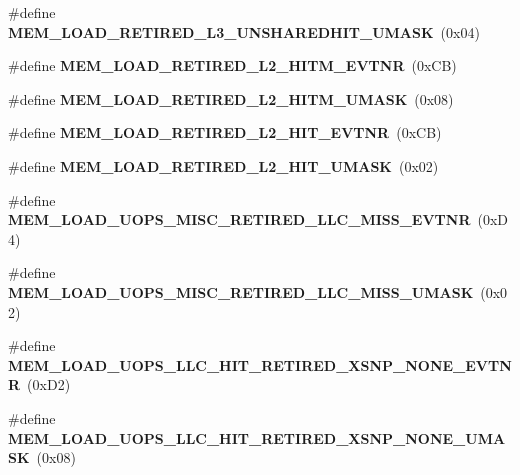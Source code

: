 \begin{DoxyCompactItemize}
\item 
\#define {\bfseries M\+E\+M\+\_\+\+L\+O\+A\+D\+\_\+\+R\+E\+T\+I\+R\+E\+D\+\_\+\+L3\+\_\+\+U\+N\+S\+H\+A\+R\+E\+D\+H\+I\+T\+\_\+\+U\+M\+A\+SK}~(0x04)\label{types_8h_a82af69ba17f2c14d73f672e6ab64392d}

\item 
\#define {\bfseries M\+E\+M\+\_\+\+L\+O\+A\+D\+\_\+\+R\+E\+T\+I\+R\+E\+D\+\_\+\+L2\+\_\+\+H\+I\+T\+M\+\_\+\+E\+V\+T\+NR}~(0x\+C\+B)\label{types_8h_a4fa3ebccc930b769a6fab108e11d98a1}

\item 
\#define {\bfseries M\+E\+M\+\_\+\+L\+O\+A\+D\+\_\+\+R\+E\+T\+I\+R\+E\+D\+\_\+\+L2\+\_\+\+H\+I\+T\+M\+\_\+\+U\+M\+A\+SK}~(0x08)\label{types_8h_a425b82db02859d2176d1626972950617}

\item 
\#define {\bfseries M\+E\+M\+\_\+\+L\+O\+A\+D\+\_\+\+R\+E\+T\+I\+R\+E\+D\+\_\+\+L2\+\_\+\+H\+I\+T\+\_\+\+E\+V\+T\+NR}~(0x\+C\+B)\label{types_8h_ab0383f3dadd106b0e563ad7459a4fc78}

\item 
\#define {\bfseries M\+E\+M\+\_\+\+L\+O\+A\+D\+\_\+\+R\+E\+T\+I\+R\+E\+D\+\_\+\+L2\+\_\+\+H\+I\+T\+\_\+\+U\+M\+A\+SK}~(0x02)\label{types_8h_a74427facc02a83299c443b9b6e424cc1}

\item 
\#define {\bfseries M\+E\+M\+\_\+\+L\+O\+A\+D\+\_\+\+U\+O\+P\+S\+\_\+\+M\+I\+S\+C\+\_\+\+R\+E\+T\+I\+R\+E\+D\+\_\+\+L\+L\+C\+\_\+\+M\+I\+S\+S\+\_\+\+E\+V\+T\+NR}~(0x\+D4)\label{types_8h_ab964a48398e98cbc7d1a7d08937a5c06}

\item 
\#define {\bfseries M\+E\+M\+\_\+\+L\+O\+A\+D\+\_\+\+U\+O\+P\+S\+\_\+\+M\+I\+S\+C\+\_\+\+R\+E\+T\+I\+R\+E\+D\+\_\+\+L\+L\+C\+\_\+\+M\+I\+S\+S\+\_\+\+U\+M\+A\+SK}~(0x02)\label{types_8h_a80c955ec4c26781b4be38c9acda01914}

\item 
\#define {\bfseries M\+E\+M\+\_\+\+L\+O\+A\+D\+\_\+\+U\+O\+P\+S\+\_\+\+L\+L\+C\+\_\+\+H\+I\+T\+\_\+\+R\+E\+T\+I\+R\+E\+D\+\_\+\+X\+S\+N\+P\+\_\+\+N\+O\+N\+E\+\_\+\+E\+V\+T\+NR}~(0x\+D2)\label{types_8h_a9cd79f19e709d1fe6974ceb31f00eaec}

\item 
\#define {\bfseries M\+E\+M\+\_\+\+L\+O\+A\+D\+\_\+\+U\+O\+P\+S\+\_\+\+L\+L\+C\+\_\+\+H\+I\+T\+\_\+\+R\+E\+T\+I\+R\+E\+D\+\_\+\+X\+S\+N\+P\+\_\+\+N\+O\+N\+E\+\_\+\+U\+M\+A\+SK}~(0x08)\label{types_8h_a88b8dc5c922214445a1261b75fdadece}


\end{DoxyCompactItemize}

